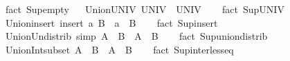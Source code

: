 \begin{isabellebody}
\isamarkupfalse%
\ {\isacharparenleft}{\kern0pt}fact\ Sup{\isacharunderscore}{\kern0pt}empty{\isacharparenright}{\kern0pt}%
\endisatagproof
{\isafoldproof}%
%
\isadelimproof
%
\endisadelimproof
\ \isanewline
\isanewline
{}\isamarkupfalse%
\ Union{\isacharunderscore}{\kern0pt}UNIV{\isacharcolon}{\kern0pt}\ {\isachardoublequoteopen}{\isasymUnion}UNIV\ {\isacharequal}{\kern0pt}\ UNIV{\isachardoublequoteclose}\isanewline
%
\isadelimproof
\ \ %
\endisadelimproof
%
\isatagproof
{}\isamarkupfalse%
\ {\isacharparenleft}{\kern0pt}fact\ Sup{\isacharunderscore}{\kern0pt}UNIV{\isacharparenright}{\kern0pt}%
\endisatagproof
{\isafoldproof}%
%
\isadelimproof
%
\endisadelimproof
\ \isanewline
\isanewline
{}\isamarkupfalse%
\ Union{\isacharunderscore}{\kern0pt}insert{\isacharcolon}{\kern0pt}\ {\isachardoublequoteopen}{\isasymUnion}{\isacharparenleft}{\kern0pt}insert\ a\ B{\isacharparenright}{\kern0pt}\ {\isacharequal}{\kern0pt}\ a\ {\isasymunion}\ {\isasymUnion}B{\isachardoublequoteclose}\isanewline
%
\isadelimproof
\ \ %
\endisadelimproof
%
\isatagproof
{}\isamarkupfalse%
\ {\isacharparenleft}{\kern0pt}fact\ Sup{\isacharunderscore}{\kern0pt}insert{\isacharparenright}{\kern0pt}%
\endisatagproof
{\isafoldproof}%
%
\isadelimproof
%
\endisadelimproof
\ \isanewline
\isanewline
{}\isamarkupfalse%
\ Union{\isacharunderscore}{\kern0pt}Un{\isacharunderscore}{\kern0pt}distrib\ {\isacharbrackleft}{\kern0pt}simp{\isacharbrackright}{\kern0pt}{\isacharcolon}{\kern0pt}\ {\isachardoublequoteopen}{\isasymUnion}{\isacharparenleft}{\kern0pt}A\ {\isasymunion}\ B{\isacharparenright}{\kern0pt}\ {\isacharequal}{\kern0pt}\ {\isasymUnion}A\ {\isasymunion}\ {\isasymUnion}B{\isachardoublequoteclose}\isanewline
%
\isadelimproof
\ \ %
\endisadelimproof
%
\isatagproof
{}\isamarkupfalse%
\ {\isacharparenleft}{\kern0pt}fact\ Sup{\isacharunderscore}{\kern0pt}union{\isacharunderscore}{\kern0pt}distrib{\isacharparenright}{\kern0pt}%
\endisatagproof
{\isafoldproof}%
%
\isadelimproof
\isanewline
%
\endisadelimproof
\isanewline
{}\isamarkupfalse%
\ Union{\isacharunderscore}{\kern0pt}Int{\isacharunderscore}{\kern0pt}subset{\isacharcolon}{\kern0pt}\ {\isachardoublequoteopen}{\isasymUnion}{\isacharparenleft}{\kern0pt}A\ {\isasyminter}\ B{\isacharparenright}{\kern0pt}\ {\isasymsubseteq}\ {\isasymUnion}A\ {\isasyminter}\ {\isasymUnion}B{\isachardoublequoteclose}\isanewline
%
\isadelimproof
\ \ %
\endisadelimproof
%
\isatagproof
{}\isamarkupfalse%
\ {\isacharparenleft}{\kern0pt}fact\ Sup{\isacharunderscore}{\kern0pt}inter{\isacharunderscore}{\kern0pt}less{\isacharunderscore}{\kern0pt}eq{\isacharparenright}{\kern0pt}%

\end{isabellebody}
